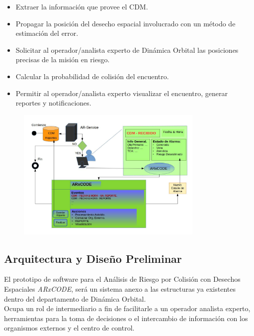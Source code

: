 \begin{itemize}
\item Extraer la informaci\'on que provee el CDM.
\item Propagar la posici\'on del desecho espacial involucrado con un m\'etodo de estimaci\'on del error.
\item Solicitar al operador/analista experto de Din\'amica Orbital las posiciones precisas de la misi\'on en riesgo.
\item Calcular la probabilidad de colisi\'on del encuentro.
\item Permitir al operador/analista experto visualizar el encuentro, generar reportes y notificaciones.
\end{itemize} 


\begin{figure}[!h]
  \centering
  \includegraphics[width=0.8\textwidth]{imagenes/ARprocedimiento}
\end{figure}

\subsection*{Arquitectura y Dise\~no Preliminar}
El prototipo de software para el An\'alisis de Riesgo por Colisi\'on con Desechos Espaciales {\it{ARxCODE}}, ser\'a un sistema anexo a las estructuras ya existentes dentro del departamento de Din\'amica Orbital.\\
Ocupa un rol de intermediario a fin de facilitarle a un operador analista experto, herramientas para la toma de decisiones o el intercambio de informaci\'on con los organismos externos y el centro de control.\\




